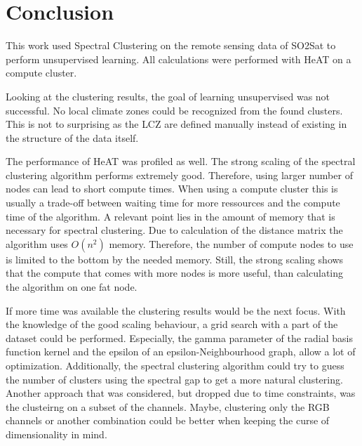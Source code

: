 \section{Conclusion}
\label{sec:conclusion}
This work used Spectral Clustering on the remote sensing data of SO2Sat to perform unsupervised learning.
All calculations were performed with \gls{HeAT} on a compute cluster.

Looking at the clustering results, the goal of learning unsupervised was not successful.
No local climate zones could be recognized from the found clusters. This is not to surprising as the \gls{LCZ}  are defined
manually instead of existing in the structure of the data itself.

The performance of \gls{HeAT} was profiled as well.
The strong scaling of the spectral clustering algorithm performs extremely good.
Therefore, using larger number of nodes can lead to short compute times.
When using a compute cluster this is usually a trade-off between waiting time for more ressources and the compute time of the algorithm.
A relevant point lies in the amount of memory that is necessary for spectral clustering. Due to calculation of the distance matrix
the algorithm uses \(O(n^2)\) memory.
Therefore, the number of compute nodes to use is limited to the bottom by the needed memory.
Still, the strong scaling shows that the compute that comes with more nodes is more useful, than calculating the algorithm on one fat node.

If more time was available the clustering results would be the next focus.
With the knowledge of the good scaling behaviour, a grid search with a part of the dataset could be performed.
Especially, the gamma parameter of the radial basis function kernel and the epsilon of an epsilon-Neighbourhood graph, allow a lot of optimization.
Additionally, the spectral clustering algorithm could try to guess the number of clusters using the spectral gap to get a more natural clustering.
Another approach that was considered, but dropped due to time constraints, was the clusteirng on a subset of the channels.
Maybe, clustering only the RGB channels or another combination could be better when keeping the curse of dimensionality in mind.
